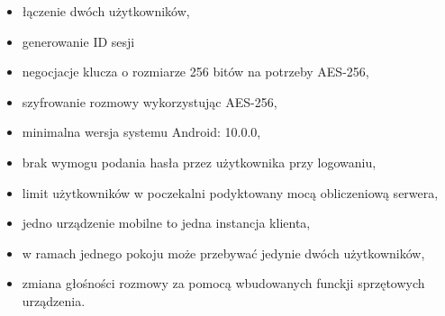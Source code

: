 \begin{itemize}
\item łączenie dwóch użytkowników,
\item generowanie ID sesji
\item negocjacje klucza o rozmiarze 256 bitów na potrzeby AES-256,
\item szyfrowanie rozmowy wykorzystując AES-256,
\item minimalna wersja systemu Android: 10.0.0,
\item brak wymogu podania hasła przez użytkownika przy logowaniu,
\item limit użytkowników w poczekalni podyktowany mocą obliczeniową serwera,
\item jedno urządzenie mobilne to jedna instancja klienta,	\item w ramach jednego pokoju może przebywać jedynie dwóch użytkowników,
\item zmiana głośności rozmowy za pomocą wbudowanych funckji sprzętowych urządzenia.
\end{itemize}
